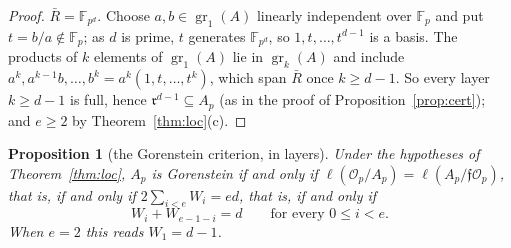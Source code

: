 \documentclass[11pt,a4paper]{article}
\newtheorem{proposition}[theorem]{Proposition}
\theoremstyle{definition}
\newcommand{\FF}{\mathbb{F}}
\newcommand{\cO}{\mathcal{O}}
\newcommand{\cf}{\mathfrak{f}}
\newcommand{\rad}{\mathfrak{r}}
\newcommand{\gr}{\operatorname{gr}}
\begin{document}
\begin{proof}
$\bar R=\FF_{p^d}$. Choose $a,b\in\gr_1(A)$ linearly independent over $\FF_p$ and put $t=b/a\notin\FF_p$; as $d$ is
prime, $t$ generates $\FF_{p^d}$, so $1,t,\dots,t^{d-1}$ is a basis. The products of $k$ elements of $\gr_1(A)$ lie
in $\gr_k(A)$ and include $a^k,a^{k-1}b,\dots,b^k=a^k(1,t,\dots,t^k)$, which span $\bar R$ once $k\ge d-1$. So every
layer $k\ge d-1$ is full, hence $\rad^{d-1}\subseteq A_p$ (as in the proof of Proposition~\ref{prop:cert}); and $e\ge2$ by Theorem~\ref{thm:loc}(c).
\end{proof}

\begin{proposition}[the Gorenstein criterion, in layers]\label{prop:gor}
Under the hypotheses of Theorem~\ref{thm:loc}, $A_p$ is Gorenstein if and only if $\ell(\cO_p/A_p)=\ell(A_p/\cf\cO_p)$,
that is, if and only if $2\sum_{i<e}W_i=ed$, that is, if and only if
\[
W_i+W_{e-1-i}=d\qquad\text{for every }0\le i<e .
\]
When $e=2$ this reads $W_1=d-1$.
\end{proposition}
\end{document}
